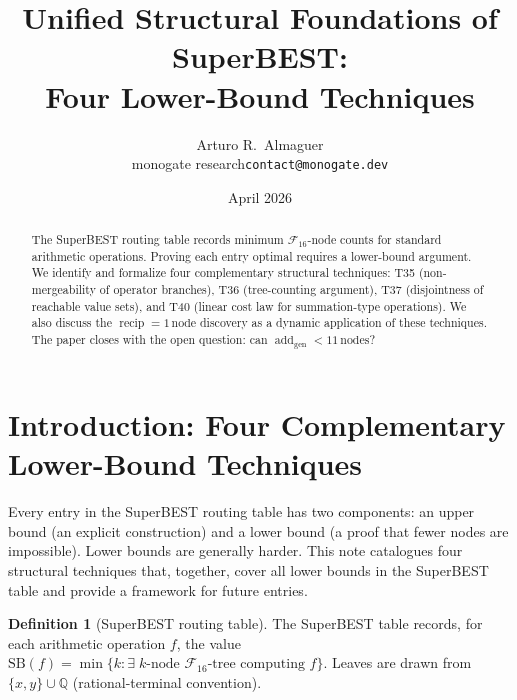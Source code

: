 \documentclass[12pt,a4paper]{article}
\title{Unified Structural Foundations of SuperBEST:\\
       Four Lower-Bound Techniques}
\author{Arturo R.\ Almaguer\\
  \small monogate research\quad\texttt{contact@monogate.dev}}
\date{April 2026}
\theoremstyle{definition}
\newtheorem{definition}[theorem]{Definition}
\newcommand{\F}{\mathcal{F}_{16}}
\newcommand{\SB}{\mathrm{SB}}
\newcommand{\recip}{\operatorname{recip}}
\newcommand{\addgen}{\operatorname{add}_{\mathrm{gen}}}
\begin{document}
\maketitle

\begin{abstract}
The SuperBEST routing table records minimum $\mathcal{F}_{16}$-node counts
for standard arithmetic operations.  Proving each entry optimal requires a
lower-bound argument.  We identify and formalize four complementary structural
techniques: T35 (non-mergeability of operator branches), T36 (tree-counting
argument), T37 (disjointness of reachable value sets), and T40 (linear cost
law for summation-type operations).  We also discuss the $\recip = 1\,\text{node}$
discovery as a dynamic application of these techniques.  The paper closes with
the open question: can $\addgen < 11\,\text{nodes}$?
\end{abstract}

\section{Introduction: Four Complementary Lower-Bound Techniques}
\label{sec:intro}

Every entry in the SuperBEST routing table has two components: an upper bound
(an explicit construction) and a lower bound (a proof that fewer nodes are
impossible).  Lower bounds are generally harder.  This note catalogues four
structural techniques that, together, cover all lower bounds in the SuperBEST
table and provide a framework for future entries.

\begin{definition}[SuperBEST routing table]
The SuperBEST table records, for each arithmetic operation $f$,
the value $\SB(f) = \min\{k : \exists\;\text{$k$-node $\F$-tree computing $f$}\}$.
Leaves are drawn from $\{x,y\}\cup\mathbb{Q}$ (rational-terminal convention).
\end{definition}
\end{document}
